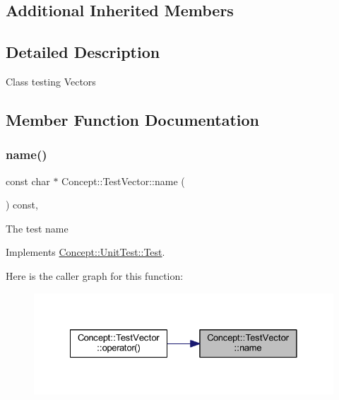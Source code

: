 \subsection*{Additional Inherited Members}


\subsection{Detailed Description}
Class testing Vectors 

\subsection{Member Function Documentation}
\mbox{\label{class_concept_1_1_test_vector_a4ac7a2e867dc34adb9ed55c38046838b}} 
\subsubsection{\texorpdfstring{name()}{name()}}
{\footnotesize\ttfamily const char $\ast$ Concept\+::\+Test\+Vector\+::name (\begin{DoxyParamCaption}{ }\end{DoxyParamCaption}) const\hspace{0.3cm}{\ttfamily [override]}, {\ttfamily [virtual]}}

The test name 

Implements \mbox{\hyperlink{class_concept_1_1_unit_test_1_1_test_a28c0cddd9719cd456fa92a142ae6c59d}{Concept\+::\+Unit\+Test\+::\+Test}}.

Here is the caller graph for this function\+:\nopagebreak
\begin{figure}[H]
\begin{center}
\leavevmode
\includegraphics[width=328pt]{class_concept_1_1_test_vector_a4ac7a2e867dc34adb9ed55c38046838b_icgraph}
\end{center}
\end{figure}
\mbox{\label{class_concept_1_1_test_vector_ac53c3efce4e5a4adad27e65d5486313d}} 
